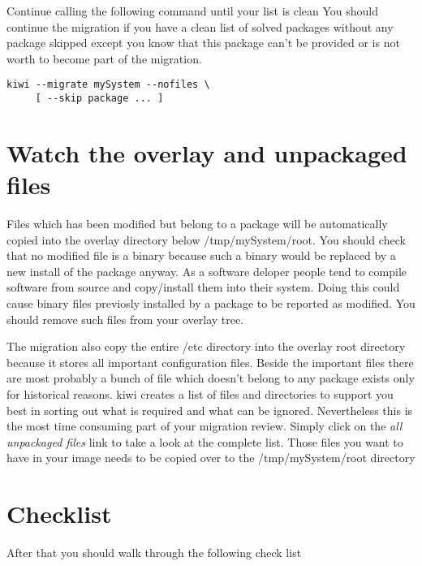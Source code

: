 Continue calling the following command until your list is clean
You should continue the migration if you have a clean list of solved
packages without any package skipped except you know that this package
can't be provided or is not worth to become part of the migration.

\begin{Command}{14cm}
\begin{verbatim}
kiwi --migrate mySystem --nofiles \
     [ --skip package ... ]
\end{verbatim}
\end{Command}

\section{Watch the overlay and unpackaged files}
Files which has been modified but belong to a package will be
automatically copied into the overlay directory below
/tmp/mySystem/root. You should check that no modified file
is a binary because such a binary would be replaced by a new
install of the package anyway. As a software deloper people
tend to compile software from source and copy/install them
into their system. Doing this could cause binary files previosly
installed by a package to be reported as modified. You should
remove such files from your overlay tree.

The migration also copy the entire /etc directory into the
overlay root directory because it stores all important configuration
files. Beside the important files there are most probably a bunch
of file which doesn't belong to any package exists only for
historical reasons. kiwi creates a list of files and
directories to support you best in sorting out what is required
and what can be ignored. Nevertheless this is the most
time consuming part of your migration review. Simply click on
the \textit{all unpackaged files} link to take a look at the
complete list. Those files you want to have in your image needs
to be copied over to the /tmp/mySystem/root directory

\section{Checklist}
After that you should walk through the following check list

